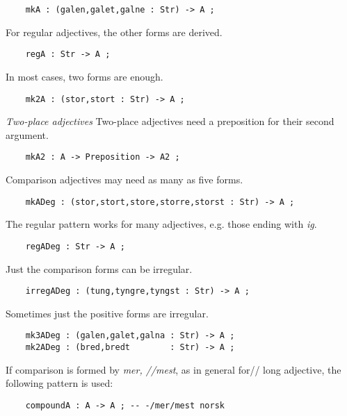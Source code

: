 \documentclass[11pt,a4paper]{article}
\newcommand{\subsubsubsection}[1]{\textit{#1}}
\begin{document}
\begin{verbatim}
    mkA : (galen,galet,galne : Str) -> A ;
\end{verbatim}

For regular adjectives, the other forms are derived. 

\begin{verbatim}
    regA : Str -> A ;
\end{verbatim}

In most cases, two forms are enough.

\begin{verbatim}
    mk2A : (stor,stort : Str) -> A ;
\end{verbatim}

\subsubsubsection{Two-place adjectives}
Two-place adjectives need a preposition for their second argument.

\begin{verbatim}
    mkA2 : A -> Preposition -> A2 ;
\end{verbatim}

Comparison adjectives may need as many as five forms. 

\begin{verbatim}
    mkADeg : (stor,stort,store,storre,storst : Str) -> A ;
\end{verbatim}

The regular pattern works for many adjectives, e.g. those ending
with \textit{ig}.

\begin{verbatim}
    regADeg : Str -> A ;
\end{verbatim}

Just the comparison forms can be irregular.

\begin{verbatim}
    irregADeg : (tung,tyngre,tyngst : Str) -> A ;
\end{verbatim}

Sometimes just the positive forms are irregular.

\begin{verbatim}
    mk3ADeg : (galen,galet,galna : Str) -> A ;
    mk2ADeg : (bred,bredt        : Str) -> A ;
\end{verbatim}

If comparison is formed by \textit{mer, //mest}, as in general for//
long adjective, the following pattern is used:

\begin{verbatim}
    compoundA : A -> A ; -- -/mer/mest norsk
\end{verbatim}
\end{document}
